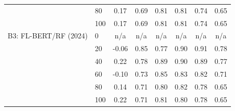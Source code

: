 \begin{table}[H]
\begin{tabular}{|l|l|c|c|c|c|c|c|}
 & 80 & 0.17 & 0.69 & 0.81 & 0.81 & 0.74 & 0.65 \\
 & 100 & 0.17 & 0.69 & 0.81 & 0.81 & 0.74 & 0.65 \\
\hline
B3: FL-BERT/RF (2024) & 0 & n/a & n/a & n/a & n/a & n/a & n/a \\
 & 20 & -0.06 & 0.85 & 0.77 & 0.90 & 0.91 & 0.78 \\
 & 40 & 0.22 & 0.78 & 0.89 & 0.90 & 0.89 & 0.77 \\
 & 60 & -0.10 & 0.73 & 0.85 & 0.83 & 0.82 & 0.71 \\
 & 80 & 0.14 & 0.71 & 0.80 & 0.82 & 0.78 & 0.65 \\
 & 100 & 0.22 & 0.71 & 0.81 & 0.80 & 0.78 & 0.65 \\
\hline
\end{tabular}
\end{table}
